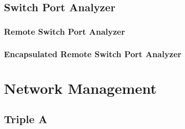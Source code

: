 \section[SPAN]{Switch Port Analyzer}

\subsection[RSPAN]{Remote Switch Port Analyzer}

\subsection[ERSPAN]{Encapsulated Remote Switch Port Analyzer}


\chapter[Network Mgmt]{Network Management}

\section[AAA]{Triple A}



\newpage

